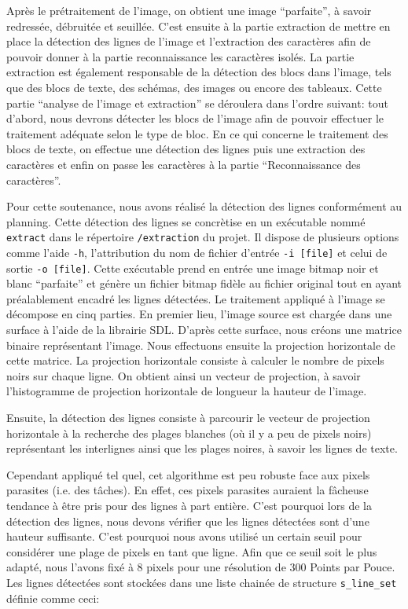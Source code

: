 \documentclass[]{report}
\begin{document}
      Après le prétraitement de l'image, on obtient une image ``parfaite'', à savoir redressée, débruitée et seuillée. C'est ensuite à la partie extraction de mettre en place la détection des lignes de l'image et l'extraction des caractères afin de pouvoir donner à la partie reconnaissance les caractères isolés. La partie extraction est également responsable de la détection des blocs dans l'image, tels que des blocs de texte, des schémas, des images ou encore des tableaux.
      Cette partie ``analyse de l'image et extraction'' se déroulera dans l'ordre suivant: tout d'abord, nous devrons détecter les blocs de l'image afin de pouvoir effectuer le traitement adéquate selon le type de bloc. En ce qui concerne le traitement des blocs de texte, on effectue une détection des lignes puis une extraction des caractères et enfin on passe les caractères à la partie ``Reconnaissance des caractères''.

      Pour cette soutenance, nous avons réalisé la détection des lignes conformément au planning. Cette détection des lignes se concrètise en un exécutable nommé \verb!extract! dans le répertoire \verb!/extraction! du projet. Il dispose de plusieurs options comme l'aide \verb!-h!, l'attribution du nom de fichier d'entrée \verb!-i [file]! et celui de sortie \verb!-o [file]!. Cette exécutable prend en entrée une image bitmap noir et blanc ``parfaite'' et génère un fichier bitmap fidèle au fichier original tout en ayant préalablement encadr\'e les lignes détectées.
      Le traitement appliqué à l'image se décompose en cinq parties. En premier lieu, l'image source est chargée dans une surface à l'aide de la librairie SDL. D'après cette surface, nous créons une matrice binaire représentant l'image. Nous effectuons ensuite la projection horizontale de cette matrice.
      La projection horizontale consiste à calculer le nombre de pixels noirs sur chaque ligne. On obtient ainsi un vecteur de projection, à savoir l'histogramme de projection horizontale de longueur la hauteur de l'image.


      Ensuite, la détection des lignes consiste à parcourir le vecteur de projection horizontale à la recherche des plages blanches (où il y a peu de pixels noirs) représentant les interlignes ainsi que les plages noires, à savoir les lignes de texte.

      Cependant appliqué tel quel, cet algorithme est peu robuste face aux pixels parasites (i.e. des tâches). En effet, ces pixels parasites auraient la fâcheuse tendance à être pris pour des lignes à part entière. C'est pourquoi lors de la détection des lignes, nous devons vérifier que les lignes détectées sont d'une hauteur suffisante. C'est pourquoi nous avons utilisé un certain seuil pour considérer une plage de pixels en tant que ligne. Afin que ce seuil soit le plus adapté, nous l'avons fixé à $8$ pixels pour une résolution de $300$ Points par Pouce. Les lignes détectées sont stockées dans une liste chainée de structure \verb!s_line_set! définie comme ceci:
\end{document}
